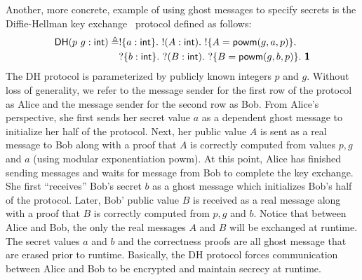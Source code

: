 Another, more concrete, example of using ghost messages to specify secrets is the
Diffie-Hellman key exchange~\cite{DH76} protocol defined as follows:
\begin{align*}
  \textsf{DH}(p\ g: \textsf{int})
  \triangleq & !\{a: \textsf{int}\}.\ !(A: \textsf{int}).\ !\{A = \textsf{powm}(g, a, p)\}.\\
             & ?\{b: \textsf{int}\}.\ ?(B: \textsf{int}).\ ?\{B = \textsf{powm}(g, b, p)\}.\ \textbf{\textsf{1}}
\end{align*}
The \textsf{DH} protocol is parameterized by publicly known integers $p$ and $g$.
Without loss of generality, we refer to the message sender for the first row of the
protocol as Alice and the message sender for the second row as Bob. From Alice's
perspective, she first sends her secret value $a$ as a dependent ghost message to
initialize her half of the protocol. Next, her public value $A$ is sent as a real
message to Bob along with a proof that $A$ is correctly computed from values $p, g$ and $a$
(using modular exponentiation \textsf{powm}). At this point, Alice has finished sending
messages and waits for message from Bob to complete the key exchange. She first
``receives'' Bob's secret $b$ as a ghost message which initializes Bob's half of the
protocol. Later, Bob' public value $B$ is received as a real message along with a proof
that $B$ is correctly computed from $p, g$ and $b$. Notice that between Alice and Bob,
the only the real messages $A$ and $B$ will be exchanged at runtime. The secret values
$a$ and $b$ and the correctness proofs are all ghost message that are erased prior to
runtime. Basically, the \textsf{DH} protocol forces communication between Alice and Bob
to be encrypted and maintain secrecy at runtime.
\vspace{-0.4em}
